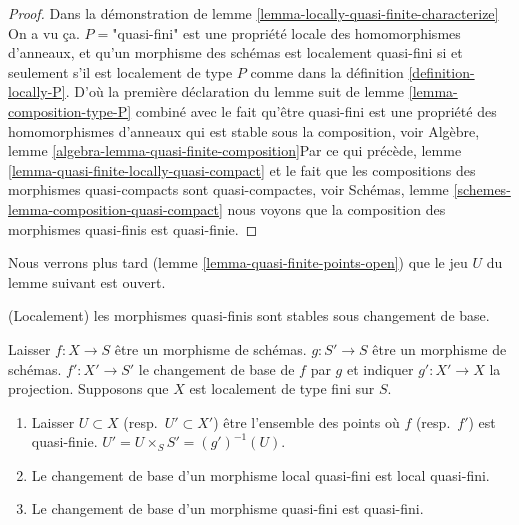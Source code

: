\begin{proof}

Dans la démonstration de lemme \ref{lemma-locally-quasi-finite-characterize}
On a vu ça. $P = $"quasi-fini" est une propriété locale des homomorphismes d'anneaux, et qu'un morphisme des schémas est localement quasi-fini si et seulement s'il est localement de type $P$ comme dans la définition \ref{definition-locally-P}. D'où la première déclaration du lemme suit de lemme \ref{lemma-composition-type-P} combiné avec le fait qu'être quasi-fini est une propriété des homomorphismes d'anneaux qui est stable sous la composition, voir Algèbre, lemme \ref{algebra-lemma-quasi-finite-composition}Par ce qui précède, lemme \ref{lemma-quasi-finite-locally-quasi-compact}
et le fait que les compositions des morphismes quasi-compacts sont quasi-compactes, voir Schémas, lemme \ref{schemes-lemma-composition-quasi-compact}
nous voyons que la composition des morphismes quasi-finis est quasi-finie.

\end{proof}

\noindent
Nous verrons plus tard (lemme \ref{lemma-quasi-finite-points-open}) que le jeu $U$ du lemme suivant est ouvert.

\begin{lemma}

\label{lemma-base-change-quasi-finite}

\begin{slogan}

(Localement) les morphismes quasi-finis sont stables sous changement de base.

\end{slogan}

Laisser $f : X \to S$ être un morphisme de schémas. $g : S' \to S$ être un morphisme de schémas. $f' : X' \to S'$ le changement de base de $f$ par $g$
et indiquer $g' : X' \to X$ la projection. Supposons que $X$ est localement de type fini sur $S$.

\begin{enumerate}

\item Laisser $U \subset X$ (resp.\ $U' \subset X'$) être l'ensemble des points où $f$ (resp.\ $f'$) est quasi-finie. $U' = U \times_S S' = (g')^{-1}(U)$.
\item Le changement de base d'un morphisme local quasi-fini est local quasi-fini.
\item Le changement de base d'un morphisme quasi-fini est quasi-fini.

\end{enumerate}

\end{lemma}

